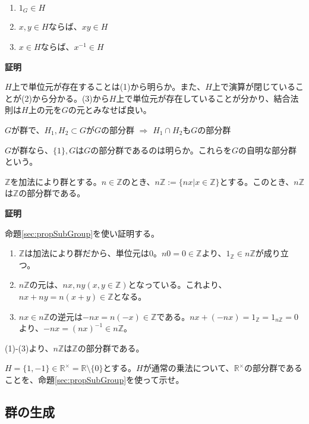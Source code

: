 \documentclass[dvipdfmx,autodetect-engine]{jsarticle}
\begin{document}
\begin{enumerate}
\renewcommand{\labelenumi}{(\arabic{enumi})}
\item $1_{G} \in H$
\item $x, y \in H$ならば、$xy \in H$
\item $x \in H$ならば、$x^{-1} \in H$
\end{enumerate}

{\bf 証明}

$H$上で単位元が存在することは(1)から明らか。また、$H$上で演算が閉じていることが(2)から分かる。(3)から$H$上で単位元が存在していることが分かり、結合法則は$H$上の元を$G$の元とみなせば良い。

\prop $G$が群で、$H_{1}, H_{2} \subset G$が$G$の部分群 $\Rightarrow$ $H_{1} \cap H_{2}$も$G$の部分群


$G$が群なら、$\{1\}, G$は$G$の部分群であるのは明らか。これらを$G$の自明な部分群という。

\exam $\mathbb{Z}$を加法により群とする。$n \in \mathbb{Z}$のとき、$n \mathbb{Z} := \{nx | x \in \mathbb{Z} \}$とする。このとき、$n\mathbb{Z}$は$\mathbb{Z}$の部分群である。

{\bf 証明}

命題\ref{sec:propSubGroup}を使い証明する。

\begin{enumerate}
\renewcommand{\labelenumi}{(\arabic{enumi})}
\item $\mathbb{Z}$は加法により群だから、単位元は$0$。$n0 = 0 \in \mathbb{Z}$より、$1_{\mathbb{Z}} \in n\mathbb{Z}$が成り立つ。
\item $n\mathbb{Z}$の元は、$nx, ny (x, y \in \mathbb{Z})$となっている。これより、$nx + ny = n(x + y) \in \mathbb{Z}$となる。
\item $nx \in n\mathbb{Z}$の逆元は$-nx = n(-x) \in \mathbb{Z}$である。$nx + (-nx) = 1_{\mathbb{Z}} = 1_{n\mathbb{Z}} = 0$より、$-nx = (nx)^{-1} \in n\mathbb{Z}$。
\end{enumerate}

(1)-(3)より、$n\mathbb{Z}$は$\mathbb{Z}$の部分群である。

\ques $H = \{1, -1\} \in \mathbb{R}^{\times} = \mathbb{R} \setminus \{0\}$とする。$H$が通常の乗法について、$\mathbb{R}^{\times}$の部分群であることを、命題\ref{sec:propSubGroup}を使って示せ。


\subsection{群の生成}
\end{document}

